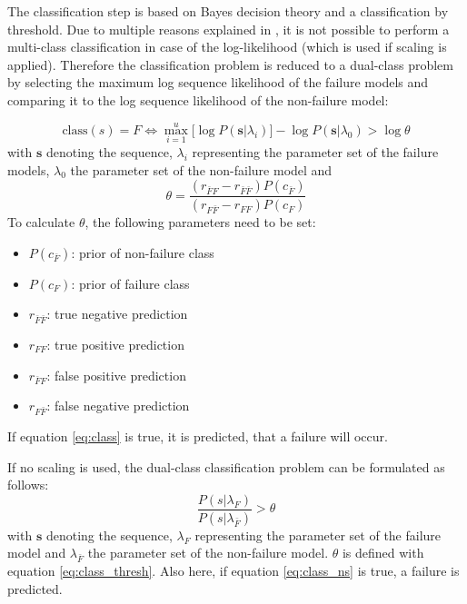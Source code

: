 \documentclass[mscthesis]{usiinfthesis}
\begin{document}
The classification step is based on Bayes decision theory and a classification
by threshold. Due to multiple reasons explained in \cite{salfner08}, it is not
possible to perform a multi-class classification in case of the log-likelihood
(which is used if scaling is applied). Therefore the classification problem is
reduced to a dual-class problem by selecting the maximum log sequence
likelihood of the failure models and comparing it to the log sequence
likelihood of the non-failure model:

\begin{equation}
    \label{eq:class}
    \text{class}(s) = F \iff \max_{i=1}^{u} \big [
        \log P(\boldsymbol{s}|\lambda_i)
    \big ] - \log P(\boldsymbol{s}|\lambda_0) > \log \theta
\end{equation}
with $\boldsymbol{s}$ denoting the sequence, $\lambda_i$ representing the
parameter set of the failure models, $\lambda_0$ the parameter set of the
non-failure model and
\begin{equation}
    \label{eq:class_thresh}
    \theta = \frac{(r_{\bar{F}F} - r_{\bar{F}\bar{F}})P(c_{\bar{F}})}
        {(r_{F \bar{F}} - r_{FF})P(c_{F})}
\end{equation}
To calculate $\theta$, the following parameters need to be set:
\begin{itemize}
    \item $ P(c_{\bar{F}}) $: prior of non-failure class
    \item $ P(c_F) $: prior of failure class
    \item $ r_{\bar{F}\bar{F}} $: true negative prediction
    \item $ r_{FF} $: true positive prediction
    \item $ r_{\bar{F}F} $: false positive prediction
    \item $ r_{F\bar{F}} $: false negative prediction
\end{itemize}
If equation \ref{eq:class} is true, it is predicted, that a failure will occur.

If no scaling is used, the dual-class classification problem can be formulated
as follows:
\begin{equation}
    \label{eq:class_ns}
    \frac{P(s|\lambda_F)}{P(s|\lambda_{\bar{F}})} > \theta
\end{equation}
with $\boldsymbol{s}$ denoting the sequence, $\lambda_F$ representing the
parameter set of the failure model and $\lambda_{\bar{F}}$ the parameter set of
the non-failure model. $\theta$ is defined with equation \ref{eq:class_thresh}.
Also here, if equation \ref{eq:class_ns} is true, a failure is predicted.
\end{document}
